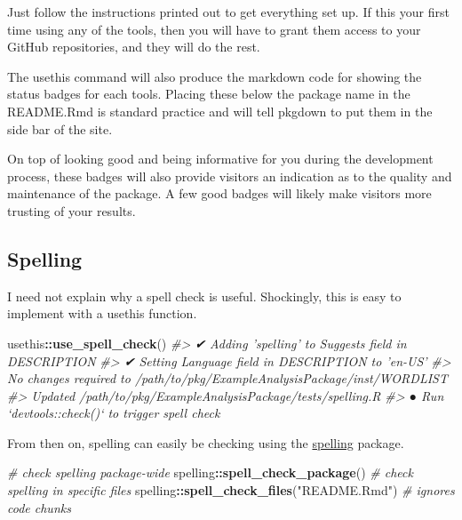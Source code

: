 \documentclass[]{book}
\newenvironment{Shaded}{\begin{snugshade}}{\end{snugshade}}
\newcommand{\CommentTok}[1]{\textcolor[rgb]{0.56,0.35,0.01}{\textit{#1}}}
\newcommand{\KeywordTok}[1]{\textcolor[rgb]{0.13,0.29,0.53}{\textbf{#1}}}
\newcommand{\NormalTok}[1]{#1}
\newcommand{\OperatorTok}[1]{\textcolor[rgb]{0.81,0.36,0.00}{\textbf{#1}}}
\newcommand{\StringTok}[1]{\textcolor[rgb]{0.31,0.60,0.02}{#1}}
\begin{document}
Just follow the instructions printed out to get everything set up. If this your first time using any of the tools, then you will have to grant them access to your GitHub repositories, and they will do the rest.

The usethis command will also produce the markdown code for showing the status badges for each tools. Placing these below the package name in the README.Rmd is standard practice and will tell pkgdown to put them in the side bar of the site.

On top of looking good and being informative for you during the development process, these badges will also provide visitors an indication as to the quality and maintenance of the package. A few good badges will likely make visitors more trusting of your results.

\hypertarget{spelling}{%
\subsection{Spelling}\label{spelling}}

I need not explain why a spell check is useful. Shockingly, this is easy to implement with a usethis function.

\begin{Shaded}
\begin{Highlighting}[]
\NormalTok{usethis}\OperatorTok{::}\KeywordTok{use_spell_check}\NormalTok{()}
\CommentTok{#> ✔ Adding 'spelling' to Suggests field in DESCRIPTION}
\CommentTok{#> ✔ Setting Language field in DESCRIPTION to 'en-US'}
\CommentTok{#> No changes required to /path/to/pkg/ExampleAnalysisPackage/inst/WORDLIST}
\CommentTok{#> Updated /path/to/pkg/ExampleAnalysisPackage/tests/spelling.R}
\CommentTok{#> ● Run `devtools::check()` to trigger spell check}
\end{Highlighting}
\end{Shaded}

From then on, spelling can easily be checking using the \href{https://github.com/ropensci/spelling}{spelling} package.

\begin{Shaded}
\begin{Highlighting}[]
\CommentTok{# check spelling package-wide}
\NormalTok{spelling}\OperatorTok{::}\KeywordTok{spell_check_package}\NormalTok{()}
\CommentTok{# check spelling in specific files}
\NormalTok{spelling}\OperatorTok{::}\KeywordTok{spell_check_files}\NormalTok{(}\StringTok{"README.Rmd"}\NormalTok{)  }\CommentTok{# ignores code chunks}
\end{Highlighting}
\end{Shaded}
\end{document}

